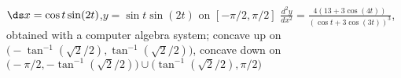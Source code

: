 {$\ds x=\cos t\sin(2t)$,\quad $y=\sin t\sin (2t)$ on $[-\pi/2,\pi/2]$}
{$\frac{d^2y}{dx^2} = \frac{4(13+3\cos(4t))}{(\cos t+3\cos(3t))^3}$, obtained with a computer algebra system; concave up on $\big(-\tan^{-1}(\sqrt{2}/2),\tan^{-1}(\sqrt{2}/2)\big)$, concave down on $\big(-\pi/2,-\tan^{-1}(\sqrt{2}/2)\big)\cup\big(\tan^{-1}(\sqrt{2}/2),\pi/2\big)$
}
